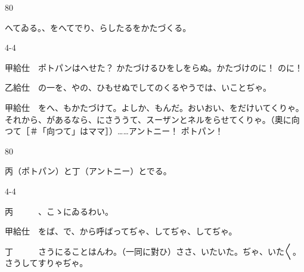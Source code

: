 \documentclass[tate,paper=b6j,jafontsize=9pt]{jlreq}
\begin{document}
\begin{azconvIndented}{8\zw}{0\zw}

へてゐる。、をへてでり、らしたるをかたづくる。

\end{azconvIndented}
\begin{azconvIndented}{4\zw}{-4\zw}

甲給仕　ポトパンはへせた？ かたづけるひをしをらぬ。かたづけのに！ のに！

乙給仕　の一を、やの、ひもせぬでしてのくるやうでは、いことぢゃ。

甲給仕　をへ、もかたづけて。よしか、もんだ。おいおい、をだけいてくりゃ。それから、があるなら、にさううて、スーザンとネルをらせてくりゃ。（奧に向つて{\small ［＃「向つて」はママ］}）……アントニー！ ポトパン！

\end{azconvIndented}
\begin{azconvIndented}{8\zw}{0\zw}

丙（ポトパン）と丁（アントニー）とでる。

\end{azconvIndented}
\begin{azconvIndented}{4\zw}{-4\zw}

丙　　　、こゝにゐるわい。

甲給仕　をば、で、から呼ばってぢゃ、してぢゃ、してぢゃ。

丁　　　さうにることはんわ。（一同に對ひ）ささ、いたいた。ぢゃ、いた{〳〵}。さうしてすりゃぢゃ。

\end{azconvIndented}
\end{document}
